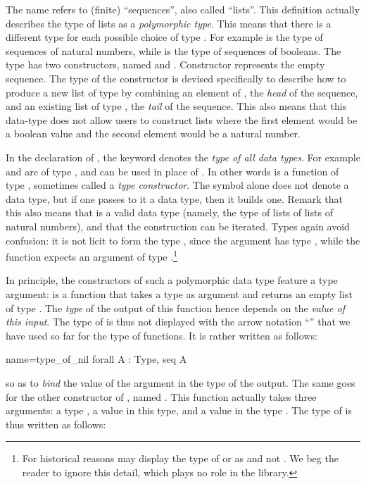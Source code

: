 The name  refers to (finite) ``sequences'', also called
``lists''. This definition actually describes the type
of lists as a {\em polymorphic type}. This means that there is a
different type  for each possible choice of type .  For example
 is the type of sequences of natural numbers, while
 is the type of sequences of booleans.
The type  has two
constructors, named  and . Constructor 
represents the empty sequence. The type of the
constructor  is devised specifically to describe how to produce a
new list of type  by combining an element of , the
\emph{head} of the sequence, and an
existing list of type , the \emph{tail} of the sequence.  This
also means that this data-type
does not allow users to construct lists where the first element would be
a boolean value and the second element would be a natural number.

In the declaration of , the keyword  denotes the
\emph{type of all data types}.  For example  and  are of type
, and can be used in place of .
In other words  is a function of type , sometimes
called a \emph{type constructor}.  The symbol  alone does not
denote a data type,
but if one passes to it a data type, then it builds one.  Remark
that this also means that  is a valid data type
(namely, the type of lists of lists of natural numbers), and
that the construction can be iterated.
Types again avoid confusion: it is not licit to form the type ,
since the argument  has type , while the function
 expects an argument of type .\footnote{For historical
reasons \Coq{} may display the type of  or  as 
and not .  We beg the reader to ignore this detail, which
plays no role in the \mcbMC{} library.}

In principle, the constructors of such a polymorphic data type feature
a type argument:
 is a function that takes a type  as argument and returns
an empty list of type . The \emph{type} of the output of
this function hence depends on the \emph{value of this input}. The
type of  is thus not displayed with the arrow notation
``'' that we have used so far for the type of
functions. It is rather written as follows:

\begin{coq}{name=type_of_nil}{}
  forall A : Type, seq A
\end{coq}
so as to \emph{bind} the value  of the argument in the type of
the output. The same goes for the other constructor of , named
.  This function actually takes three arguments: a type ,
a value in this type, and a value in the type .  The type
of  is thus written as follows:

